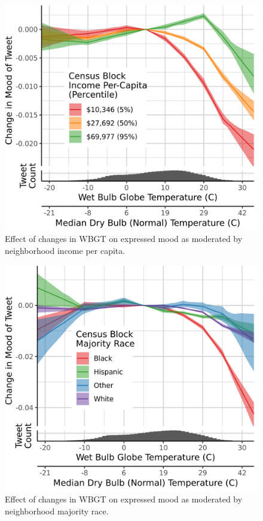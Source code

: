\documentclass[9pt,twocolumn,twoside,lineno]{pnas-new}
\begin{document}
\begin{figure}[H]
\centering
 \includegraphics[width=0.8\linewidth]{../../res/wbgt-income.png}
 \caption{Effect of changes in WBGT on expressed mood as moderated by neighborhood income per capita.}
\label{fig:income}
\end{figure}

\begin{figure}[H]
\centering
 \includegraphics[width=0.8\linewidth]{../../res/wbgt-race_q.png}
 \caption{Effect of changes in WBGT on expressed mood as moderated by neighborhood majority race.}
\label{fig:race}
\end{figure}
\end{document}
